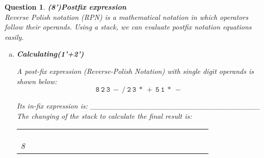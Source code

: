 \documentclass[10.5pt]{article}
\newtheorem{Q}{Question}
\begin{document}
\pagebreak
	\begin{Q}\textbf{(8')Postfix expression}\\
	Reverse Polish notation (RPN) is a mathematical notation in which operators follow their operands. Using a stack, we can evaluate postfix notation equations easily.
	
	\begin{enumerate}[(a)]
		\item \textbf{Calculating(1'+2')}
		
		A post-fix expression (Reverse-Polish Notation) with single digit operands is shown below:\\
		$$\mathtt{8\ 2\ 3\ -\ /\ 2\ 3\ *\ +\ 5\ 1\ *\ -}$$
		
		
		Its in-fix expression is: \_\_\_\_\_\_\_\_\_\_\_\_\_\_\_\_\_\_\_\_\_\_\_\_\_\_\_\_\_\_\_\_\\
		The changing of the stack to calculate the final result is:
		\begin{table}[htb]
			\centering\begin{tabular}{|l|l|l|l|l|l|l|l|l|l|l|l|l|l|l|l|l|l|l|l|l|l|l|}
				\cline{1-1} \cline{3-3} \cline{5-5} \cline{7-7} \cline{9-9} \cline{11-11} \cline{13-13} \cline{15-15} \cline{17-17} \cline{19-19} \cline{21-21} \cline{23-23}
				&  &  &  &  &  &  &  &  &  &  &  &  &  &  &  &  &  &  &  &  &  &  \\ \cline{1-1} \cline{3-3} \cline{5-5} \cline{7-7} \cline{9-9} \cline{11-11} \cline{13-13} \cline{15-15} \cline{17-17} \cline{19-19} \cline{21-21} \cline{23-23} 
				&  &  &  &  &  &  &  &  &  &  &  &  &  &  &  &  &  &  &  &  &  &  \\ \cline{1-1} \cline{3-3} \cline{5-5} \cline{7-7} \cline{9-9} \cline{11-11} \cline{13-13} \cline{15-15} \cline{17-17} \cline{19-19} \cline{21-21} \cline{23-23} 
				&  &  &  &  &  &  &  &  &  &  &  &  &  &  &  &  &  &  &  &  &  &  \\ \cline{1-1} \cline{3-3} \cline{5-5} \cline{7-7} \cline{9-9} \cline{11-11} \cline{13-13} \cline{15-15} \cline{17-17} \cline{19-19} \cline{21-21} \cline{23-23} 
				8 &  &  &  &  &  &  &  &  &  &  &  &  &  &  &  &  &  &  &  &  &  &  \\ \cline{1-1} \cline{3-3} \cline{5-5} \cline{7-7} \cline{9-9} \cline{11-11} \cline{13-13} \cline{15-15} \cline{17-17} \cline{19-19} \cline{21-21} \cline{23-23} 
			\end{tabular}
		\end{table}


\end{enumerate}
\end{Q}
\end{document}
